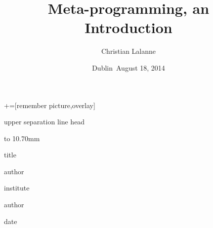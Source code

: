 \documentclass[notes=hide,xcolor=svgnames,professionalfonts,lualatex]{beamer}
\title[Metaprogramming, an Introduction]
{Meta-programming, an Introduction}
\author[Christian Lalanne \emph{et. al}] %
{\textcolor{CherryRed}{Christian Lalanne}}
\institute[ICHEC] %
{
     \emph{Irish Centre for High-End Computing}    
}
\date[August 18, 2014] %
{Dublin\ August 18, 2014}
\begin{document}
+=[remember picture,overlay]

\everymath{\displaystyle}
\begin{frame}[plain]
 \begin{beamercolorbox}[wd=1.0\paperwidth,colsep=2.5pt]{upper separation line head}
 \end{beamercolorbox}    
\begin{beamercolorbox}[wd=1.0\paperwidth,colsep=2.5pt]{}
\vbox to 10.70mm {%
 \vfill {\hskip0mm } \vfil%
}%
\hskip-1.75mm
\end{beamercolorbox}

\begin{center}
\begin{beamercolorbox}[wd=1.0\paperwidth,center,ht=13.0mm]{title}
  \begin{minipage}{0.65\paperwidth}
   \begin{center}
    \inserttitle
    \end{center}
  \end{minipage}
\end{beamercolorbox}

\begin{beamercolorbox}[wd=\paperwidth,center,ht=11mm]{author}
   \insertauthor
\end{beamercolorbox}

\begin{beamercolorbox}[wd=\paperwidth,center,ht=7mm]{institute}
    \insertinstitute
\end{beamercolorbox}

\begin{beamercolorbox}[wd=\paperwidth,center,ht=9mm]{author}
\end{beamercolorbox}

\begin{beamercolorbox}[wd=\paperwidth,center,ht=13mm]{date}
  \insertdate
\end{beamercolorbox}

\end{center}
\addtocounter{framenumber}{-1}
\end{frame}
\end{document}
